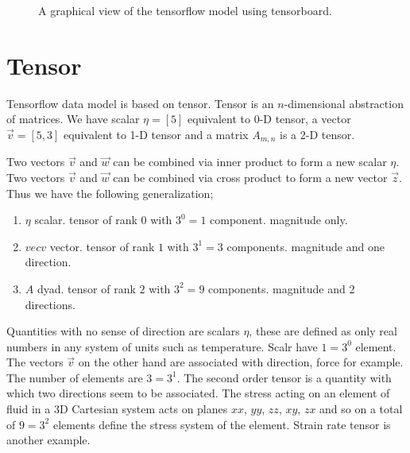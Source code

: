 \documentclass[vecarrow]{svproc}
\begin{document}
\begin{figure} 
\caption{A graphical view of the tensorflow model using tensorboard.}
\label{fig:4} 
\end{figure} 

\section{Tensor}

Tensorflow data model is based on tensor. Tensor is an $n$-dimensional abstraction of matrices. We have 
scalar $\eta=[5]$ equivalent to 0-D tensor, a vector $\vec{v}=[5, 3]$ equivalent to 1-D tensor and a matrix 
$A_{m,n}$ is a 2-D tensor\cite{bowen2008introduction}\cite{kolecki2002introduction}.

Two vectors $\vec{v}$ and $\vec{w}$ can be combined via inner product to form a new scalar $\eta$. Two
vectors $\vec{v}$ and $\vec{w}$ can be combined via cross product to form a new vector $\vec{z}$. Thus we
have the following generalization;
\begin{enumerate}
\item $\eta$ scalar. tensor of rank $0$ with $3^0=1$ component. magnitude only.
\item $vec{v}$ vector. tensor of rank $1$ with $3^1=3$ components. magnitude and one direction.
\item $A$ dyad. tensor of rank $2$ with $3^2=9$ components. magnitude and 2 directions.
\end{enumerate}

Quantities with no sense of direction are scalars $\eta$, these are defined as only real numbers in any system of units such as temperature. Scalr have $1 = 3^0$ element. The vectors $\vec{v}$ on the other hand are associated with direction, force for example. The number of elements are $3 = 3^1$. The second order tensor is a quantity with which two directions seem to be associated. The stress acting on an element of fluid in a 3D Cartesian system acts on planes $xx$, $yy$, $zz$, $xy$, $zx$ and so on a total of $9 = 3^2$ elements define the stress system of the element. Strain rate tensor is another example.
\end{document}

